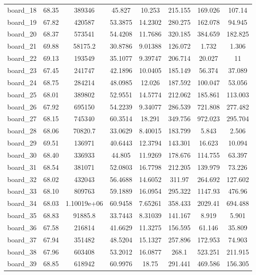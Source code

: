 \begin{table*}[!htbp]
\begin{center}
{\begin{tabular}{|c|c|cccc|cc|}
board\_18 & 68.35 & 389346 & 45.827 & 10.253 & 215.155 & 169.026 & 107.14 \\
board\_19 & 67.82 & 420587 & 53.3875 & 14.2302 & 280.275 & 162.078 & 94.945 \\
board\_20 & 68.37 & 573541 & 54.4208 & 11.7686 & 320.185 & 384.659 & 182.825 \\
board\_21 & 69.88 & 58175.2 & 30.8786 & 9.01388 & 126.072 & 1.732 & 1.306 \\
board\_22 & 69.13 & 193549 & 35.1077 & 9.39747 & 206.714 & 20.027 & 11 \\
board\_23 & 67.45 & 241747 & 42.1896 & 10.0405 & 185.149 & 56.374 & 37.089 \\
board\_24 & 68.75 & 284214 & 48.0985 & 12.026 & 187.592 & 100.047 & 53.056 \\
board\_25 & 68.01 & 389802 & 52.9551 & 14.5774 & 212.062 & 185.861 & 113.003 \\
board\_26 & 67.92 & 695150 & 54.2239 & 9.34077 & 286.539 & 721.808 & 277.482 \\
board\_27 & 68.15 & 745340 & 60.3514 & 18.291 & 349.756 & 972.023 & 295.704 \\
board\_28 & 68.06 & 70820.7 & 33.0629 & 8.40015 & 183.799 & 5.843 & 2.506 \\
board\_29 & 69.51 & 136971 & 40.6443 & 12.3794 & 143.301 & 16.623 & 10.094 \\
board\_30 & 68.40 & 336933 & 44.805 & 11.9269 & 178.676 & 114.755 & 63.397 \\
board\_31 & 68.54 & 381071 & 52.0803 & 16.7798 & 212.205 & 139.979 & 73.226 \\
board\_32 & 68.02 & 432043 & 56.4688 & 14.6052 & 311.97 & 264.692 & 127.602 \\
board\_33 & 68.10 & 809763 & 59.1889 & 16.0954 & 295.322 & 1147.93 & 476.96 \\
board\_34 & 68.03 & 1.10019e+06 & 60.9458 & 7.65261 & 358.433 & 2029.41 & 694.488 \\
board\_35 & 68.83 & 91885.8 & 33.7443 & 8.31039 & 141.167 & 8.919 & 5.901 \\
board\_36 & 67.58 & 216814 & 41.6629 & 11.3275 & 156.595 & 61.146 & 35.809 \\
board\_37 & 67.94 & 351482 & 48.5204 & 15.1327 & 257.896 & 172.953 & 74.903 \\
board\_38 & 67.96 & 603408 & 53.2012 & 16.0877 & 268.1 & 523.251 & 211.915 \\
board\_39 & 68.85 & 618942 & 60.9976 & 18.75 & 291.441 & 469.586 & 156.305 \\

\end{tabular}}
\end{center}
\end{table*}
